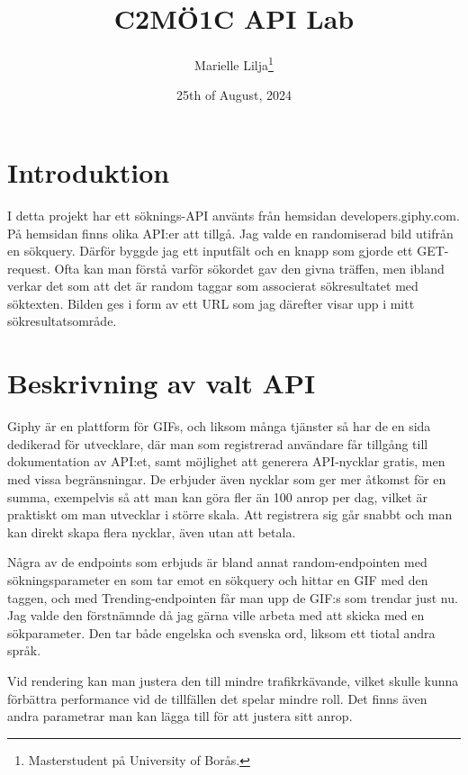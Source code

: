 \documentclass[12pt, letterpaper]{article}
\title{C2MÖ1C API Lab}
\author{Marielle Lilja\thanks{Masterstudent på University of Borås.}}
\date{25th of August, 2024}
\begin{document}
\maketitle

\tableofcontents

\section{Introduktion}
I detta projekt har ett söknings-API använts från hemsidan developers.giphy.com. På hemsidan finns olika API:er att tillgå. Jag valde en randomiserad bild utifrån en sökquery. Därför byggde jag ett inputfält och en knapp som gjorde ett GET-request. Ofta kan man förstå varför sökordet gav den givna träffen, men ibland verkar det som att det är random taggar som associerat sökresultatet med söktexten. Bilden ges i form av ett URL som jag därefter visar upp i mitt sökresultatsområde.


\section{Beskrivning av valt API}
Giphy är en plattform för GIFs, och liksom många tjänster så har de en sida dedikerad för utvecklare, där man som registrerad användare får tillgång till dokumentation av API:et, samt möjlighet att generera API-nycklar gratis, men med vissa begränsningar. De erbjuder även nycklar som ger mer åtkomst för en summa, exempelvis så att man kan göra fler än 100 anrop per dag, vilket är praktiskt om man utvecklar i större skala. Att registrera sig går snabbt och man kan direkt skapa flera nycklar, även utan att betala.

Några av de  endpoints som erbjuds är bland annat random-endpointen med sökningsparameter en som tar emot en sökquery och hittar en GIF med den taggen, och med Trending-endpointen får man upp de GIF:s som trendar just nu. Jag valde den förstnämnde då jag gärna ville arbeta med att skicka med en sökparameter. Den tar både engelska och svenska ord, liksom ett tiotal andra språk.

Vid rendering kan man justera den till mindre trafikrkävande, vilket skulle kunna förbättra performance vid de tillfällen det spelar mindre roll. Det finns även andra parametrar man kan lägga till för att justera sitt anrop.
\end{document}
